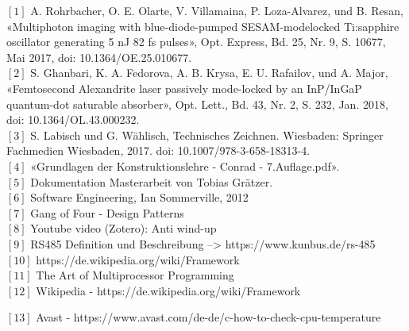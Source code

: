 $[1]$	A. Rohrbacher, O. E. Olarte, V. Villamaina, P. Loza-Alvarez, und B. Resan, «Multiphoton imaging with blue-diode-pumped SESAM-modelocked Ti:sapphire oscillator generating 5 nJ 82 fs pulses», Opt. Express, Bd. 25, Nr. 9, S. 10677, Mai 2017, doi: 10.1364/OE.25.010677.\\

$[2]$	S. Ghanbari, K. A. Fedorova, A. B. Krysa, E. U. Rafailov, und A. Major, «Femtosecond Alexandrite laser passively mode-locked by an InP/InGaP quantum-dot saturable absorber», Opt. Lett., Bd. 43, Nr. 2, S. 232, Jan. 2018, doi: 10.1364/OL.43.000232.\\

$[3]$    S. Labisch und G. Wählisch, Technisches Zeichnen. Wiesbaden: Springer Fachmedien Wiesbaden, 2017. doi: 10.1007/978-3-658-18313-4.\\

$[4]$   «Grundlagen der Konstruktionslehre - Conrad - 7.Auflage.pdf».\\

$[5]$    Dokumentation Masterarbeit von Tobias Grätzer.\\

$[6]$   Software Engineering, Ian Sommerville, 2012\\

$[7]$   Gang of Four - Design Patterns\\

$[8]$   Youtube video (Zotero): Anti wind-up\\

$[9]$   RS485 Definition und Beschreibung --> https://www.kunbus.de/rs-485\\

$[10]$  https://de.wikipedia.org/wiki/Framework\\

$[11]$  The Art of Multiprocessor Programming\\

$[12]$  Wikipedia - https://de.wikipedia.org/wiki/Framework

$[13]$  Avast - https://www.avast.com/de-de/c-how-to-check-cpu-temperature